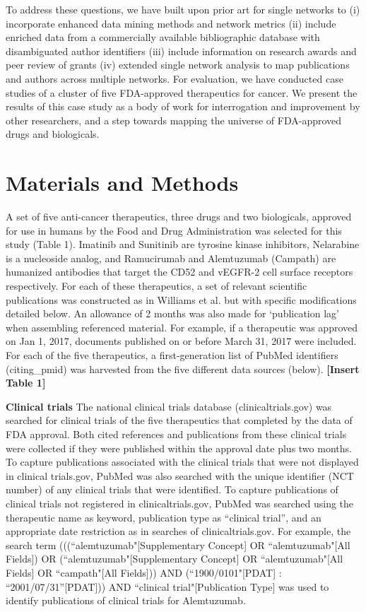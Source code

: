 \documentclass[10pt,letterpaper]{article}
\begin{document}
To address these questions, we have built upon prior art for single networks to (i) incorporate enhanced data mining methods and network metrics (ii) include enriched data from a commercially available bibliographic database with disambiguated author identifiers (iii) include information on research awards and peer review of grants (iv) extended single network analysis to map publications and authors across multiple networks. For evaluation, we have conducted case studies of a cluster of five FDA-approved therapeutics for cancer. We present the results of this case study as a body of work for interrogation and improvement by other researchers, and a step towards mapping the universe of FDA-approved drugs and biologicals.

\section*{Materials and Methods}  A set of five anti-cancer therapeutics, three drugs and two biologicals, approved for use in humans by the Food and Drug Administration was selected for this study (Table 1). Imatinib and Sunitinib are tyrosine kinase inhibitors, Nelarabine is a nucleoside analog, and Ramucirumab and Alemtuzumab (Campath) are humanized antibodies that target the CD52 and vEGFR-2 cell surface receptors respectively. For each of these therapeutics, a set of relevant scientific publications was constructed as in Williams et al.\cite{bibWilliams} but with specific modifications detailed below. An allowance of 2 months was also made for `publication lag' when assembling referenced material. For example, if a therapeutic was approved on Jan 1, 2017, documents published  on or before March 31, 2017 were included. For each of the five therapeutics, a first-generation list of PubMed identifiers (citing\_pmid) was harvested from the five different data sources (below). \textbf{[Insert Table 1]}

\textbf{Clinical trials} The national clinical trials database (clinicaltrials.gov) was searched for clinical trials of the five therapeutics that completed by the data of FDA approval. Both cited references and publications from these clinical trials were collected if they were published within the approval date plus two months. To capture publications associated with the clinical trials that were not displayed in clinical trials.gov, PubMed was also searched with the unique identifier (NCT number) of any clinical trials that were identified. To capture publications of clinical trials not registered in clinicaltrials.gov, PubMed was searched using the therapeutic name as keyword, publication type as ``clinical trial'', and an appropriate date restriction as in searches of clinicaltrials.gov. For example, the search term (((``alemtuzumab"[Supplementary Concept] OR ``alemtuzumab"[All Fields]) OR (``alemtuzumab"[Supplementary Concept] OR ``alemtuzumab"[All Fields] OR ``campath"[All Fields])) AND (``1900/0101"[PDAT] : ``2001/07/31''[PDAT])) AND ``clinical trial"[Publication Type] was used to identify publications of clinical trials for Alemtuzumab.
\end{document}
